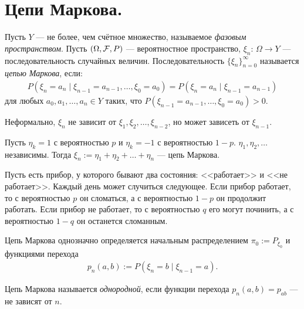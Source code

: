 \documentclass[../main.tex]{subfiles}
\begin{document}
\section{Цепи Маркова.}

\begin{df}
	Пусть $ Y $ --- не более, чем счётное множество, называемое \textit{фазовым пространством}. Пусть $ (\Omega,\mathcal F,P) $ --- вероятностное пространство, $ \xi_n \colon\, \Omega \to Y $ --- последовательность случайных величин. Последовательность $ \{\xi_n\}_{n = 0}^{\infty} $ называется \textit{цепью Маркова}, если:
 \begin{align*}
  P(\xi_n = a_n \mid \xi_{n-1} = a_{n-1}, \ldots, \xi_0 = a_0) = P(\xi_n = a_n \mid \xi_{n-1} = a_{n-1})
 \end{align*} для любых $ a_0, a_1, \ldots, a_n \in Y $ таких, что $ P(\xi_{n-1} = a_{n-1}, \ldots, \xi_0 = a_0) > 0 $.

 Неформально, $ \xi_n $ не зависит от $ \xi_1, \xi_2, \ldots, \xi_{n-2} $, но может зависеть от $ \xi_{n-1} $.
\end{df}
\begin{exmpl}
 \label{exmpl:random_walk_z}
 Пусть $ \eta_k = 1 $ с вероятностью $ p $ и $ \eta_k = -1 $  с вероятностью $ 1-p $. $ \eta_1, \eta_2, \ldots $  независимы. Тогда $ \xi_n := \eta_1 + \eta_2 + \ldots + \eta_n $ --- цепь Маркова.
\end{exmpl}
\begin{exmpl}
 \label{exmpl:random_walk_machine}
 Пусть есть прибор, у которого бывают два состояния: <<работает>> и <<не работает>>. Каждый день может случиться следующее. Если прибор работает, то с вероятностью $ p $ он сломаться, а с вероятностью $ 1-p $ он продолжит работать. Если прибор не работает, то с вероятностью $ q $ его могут починить, а с вероятностью $ 1-q $ он останется сломанным.
\end{exmpl}
\begin{remrk}
 Цепь Маркова однозначно определяется начальным распределением $ \pi_0 := P_{\xi_0} $ и функциями перехода
 \begin{align*}
  p_n(a,b) := P(\xi_n = b \mid \xi_{n-1} = a).
 \end{align*}
\end{remrk}

\begin{df}
 Цепь Маркова называется \textit{однородной}, если функции перехода $ p_n(a,b) = p_{ab} $ --- не зависят от $ n $.
\end{df}
\end{document}
